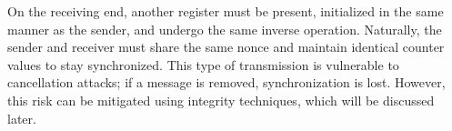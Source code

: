 On the receiving end, another register must be present, initialized in the same manner as the sender, and undergo the same inverse operation. Naturally, the sender and receiver must share the same nonce and maintain identical counter values to stay synchronized. This type of transmission is vulnerable to cancellation attacks; if a message is removed, synchronization is lost. However, this risk can be mitigated using integrity techniques, which will be discussed later.
